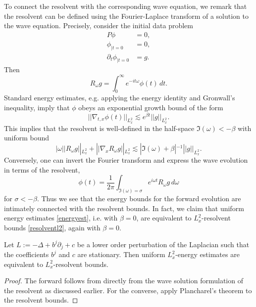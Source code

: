To connect the resolvent with the corresponding wave equation, we remark that the resolvent can be defined using the Fourier-Laplace transform of a solution to the wave equation. Precisely, consider the initial data problem
	\begin{align*}
		P\phi
			&= 0, \\
		\phi_{|t = 0}
			&= 0, \\
		\partial_t\phi_{|t = 0}
			&= g.	
	\end{align*}
Then 
	\[
		R_\omega g = \int_0^\infty e^{- i t \omega} \phi (t) \, dt.
	\]	
Standard energy estimates, e.g. applying the energy identity and Gronwall's inequality, imply that $\phi$ obeys an exponential growth bound of the form 
	\begin{equation}\label{eq:energyest}\tag{E}
		||\nabla_{t, x} \phi (t)||_{L^2_x} \lesssim e^{\beta t} ||g||_{L^2_x}.
	\end{equation}
This implies that the resolvent is well-defined in the half-space $\Im(\omega) < - \beta$ with uniform bound
	\begin{equation}\label{eq:resolventl2}\tag{LR}
		|\omega| |R_\omega g||_{L^2_x} + ||\nabla_x R_\omega g||_{L^2_x} \lesssim |\Im(\omega) + \beta|^{-1} ||g||_{L^2_x}.
	\end{equation}
Conversely, one can invert the Fourier transform and express the wave evolution in terms of the resolvent, 
	\[
		\phi(t) = \frac{1}{2\pi} \int_{\Im(\omega) = \sigma} e^{i \omega t} R_\omega g \, d \omega
	\]	
for $\sigma < - \beta$. Thus we see that the energy bounds for the forward evolution are intimately connected with the resolvent bounds. In fact, we claim that uniform energy estimates \eqref{energyest}, i.e. with $\beta = 0$, are equivalent to $L^2_x$-resolvent bounds \eqref{resolventl2}, again with $\beta =0$. 

\begin{theorem}\label{thm:energyresolvent1}
	Let $L := - \Delta + b^j \partial_j + c$ be a lower order perturbation of the Laplacian such that the coefficients $b^j$ and $c$ are stationary. Then uniform $L^2_x$-energy estimates are equivalent to $L^2_x$-resolvent bounds. 
\end{theorem}

\begin{proof}
	The forward follows from directly from the wave solution formulation of the resolvent as discussed earlier. For the converse, apply Plancharel's theorem to the resolvent bounds. 
\end{proof}


